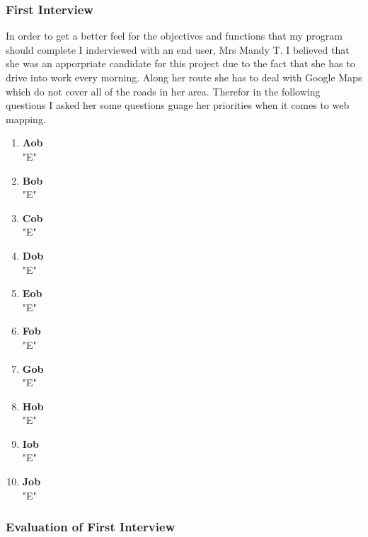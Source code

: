 \begin{flushleft}
            \subsubsection{First Interview}
            \large
            In order to get a better feel for the objectives and functions that my program should complete I inderviewed with an end user, Mrs Mandy T. I believed that she was an apporpriate candidate for this
            project due to the fact that she has to drive into work every morning. Along her route she has to deal with Google Maps which do not cover all of the roads in her area. Therefor in the following questions
            I asked her some questions guage her priorities when it comes to web mapping.
            \bk
            \begin{enumerate}
                \item {\bf{Aob}} \\
                \bk
                "E"
                \item {\bf{Bob}} \\
                \bk
                "E"
                \item {\bf{Cob}} \\
                \bk
                "E"
                \item {\bf{Dob}} \\
                \bk
                "E"
                \item {\bf{Eob}} \\
                \bk
                "E"
                \item {\bf{Fob}} \\
                \bk
                "E"
                \item {\bf{Gob}} \\
                \bk
                "E"
                \item {\bf{Hob}} \\
                \bk
                "E"
                \item {\bf{Iob}} \\
                \bk
                "E"
                \item {\bf{Job}} \\
                \bk
                "E"
            \end{enumerate}
            
            \subsubsection{Evaluation of First Interview}


\end{flushleft}

